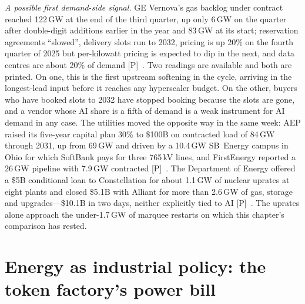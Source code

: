 \emph{A possible first demand-side signal.} GE Vernova's gas backlog under contract reached 122\,GW at the end of the third quarter, up only 6\,GW on the quarter after double-digit additions earlier in the year and 83\,GW at its start; reservation agreements ``slowed'', delivery slots run to 2032, pricing is up 20\% on the fourth quarter of 2025 but per-kilowatt pricing is expected to dip in the next, and data centres are about 20\% of demand [P]~\cite{cap-gev-q3}. Two readings are available and both are printed. On one, this is the first upstream softening in the cycle, arriving in the longest-lead input before it reaches any hyperscaler budget. On the other, buyers who have booked slots to 2032 have stopped booking because the slots are gone, and a vendor whose AI share is a fifth of demand is a weak instrument for AI demand in any case. The utilities moved the opposite way in the same week: AEP raised its five-year capital plan 30\% to \$100B on contracted load of 84\,GW through 2031, up from 69\,GW and driven by a 10.4\,GW SB~Energy campus in Ohio for which SoftBank pays for three 765\,kV lines, and FirstEnergy reported a 26\,GW pipeline with 7.9\,GW contracted [P]~\cite{cap-utility-capex}. The Department of Energy offered a \$5B conditional loan to Constellation for about 1.1\,GW of nuclear uprates at eight plants and closed \$5.1B with Alliant for more than 2.6\,GW of gas, storage and upgrades---\$10.1B in two days, neither explicitly tied to AI [P]~\cite{cap-doe-loans}. The uprates alone approach the under-1.7\,GW of marquee restarts on which this chapter's comparison has rested.

\section{Energy as industrial policy: the token factory's power bill}

